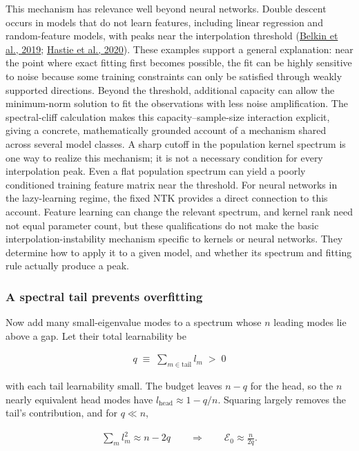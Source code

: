This mechanism has relevance well beyond neural networks. Double descent occurs
in models that do not learn features, including linear regression and random-feature
models, with peaks near the interpolation threshold
(\href{https://arxiv.org/abs/1812.11118}{Belkin et al., 2019};
\href{https://arxiv.org/abs/1903.08560}{Hastie et al., 2020}). These examples support
a general explanation: near the point where exact fitting first becomes possible,
the fit can be highly sensitive to noise because some training constraints can
only be satisfied through weakly supported directions. Beyond the threshold,
additional capacity can allow the minimum-norm solution to fit the observations
with less noise amplification. The spectral-cliff calculation makes this
capacity--sample-size interaction explicit, giving a concrete, mathematically
grounded account of a mechanism shared across several model classes. A sharp
cutoff in the population kernel spectrum is one way to realize this mechanism;
it is not a necessary condition for every interpolation peak. Even a flat
population spectrum can yield a poorly conditioned training feature matrix near
the threshold. For neural networks in the lazy-learning regime, the fixed NTK
provides a direct connection to this account. Feature learning can change the
relevant spectrum, and kernel rank need not equal parameter count, but these
qualifications do not make the basic interpolation-instability mechanism specific
to kernels or neural networks. They determine how to apply it to a given model,
and whether its spectrum and fitting rule actually produce a peak.

\subsubsection*{A spectral tail prevents overfitting}

Now add many small-eigenvalue modes to a spectrum whose $n$ leading modes lie above a
gap. Let their total learnability be

\begin{align}
    q \;\equiv\; \sum_{m \in \text{tail}} l_m \;>\;0
\end{align}

with each tail learnability small. The budget leaves $n-q$ for the head, so the $n$
nearly equivalent head modes have $l_{\mathrm{head}}\approx1-q/n$. Squaring largely
removes the tail's contribution, and for $q\ll n$,

\begin{align}
    \sum_m l^2_m \approx n - 2q
    \qquad\Longrightarrow\qquad
    \mathcal{E}_0 \approx \frac{n}{2q} .
\end{align}

